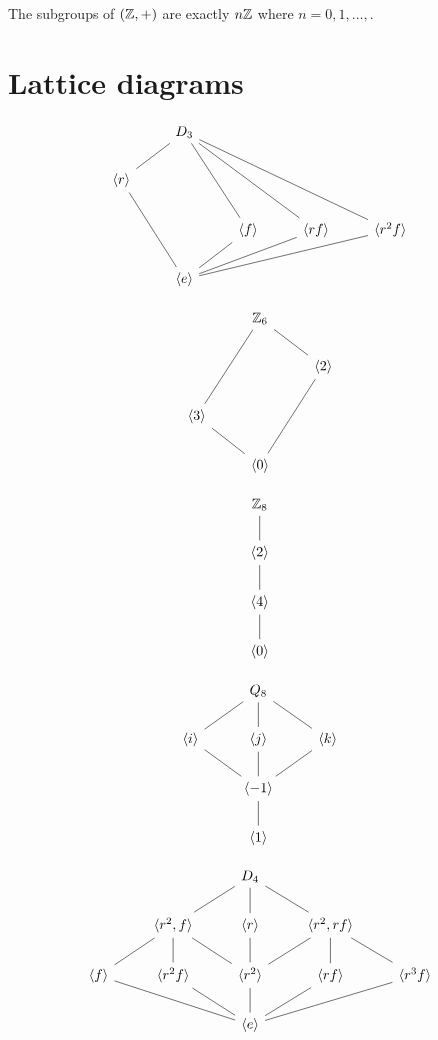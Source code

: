\documentclass{ximera}
\begin{document}
\begin{corollary}
  The subgroups of $(\mathbb Z,+)$ are exactly $n\mathbb Z$ where $n = 0,1,\dots,$.
\end{corollary}


\section{Lattice diagrams}

\[
\begin{tikzcd}
       & D_3 \ar[rdd,-]\ar[rrdd,-]\ar[rrrdd,-]  \ar[ld,-] & & &      \\
 \<r\> \ar[rdd,-]       &       &  & &  \\
       &       &  \< f\> \ar[ld,-]   &  \< rf\> \ar[lld,-]       &  \< r^2f\> \ar[llld,-]        \\   
       & \<e\> & & &
\end{tikzcd}
\]

\[
\begin{tikzcd}
       & \Z_6 \ar[rd,-]  \ar[ldd,-] &       \\
       &       & \<2\> \ar[ldd,-]\\
\< 3\> \ar[rd,-]&       &       \\   
       & \<0\> &
\end{tikzcd}
\]

\[
\begin{tikzcd}
  \Z_8  \ar[d,-] \\
  \<2\> \ar[d,-] \\
  \<4\> \ar[d,-] \\   
  \<0\> 
\end{tikzcd}
\]


\[
\begin{tikzcd}
       & Q_8 \ar[rd,-] \ar[d,-] \ar[ld,-] &       \\
\<i\>  \ar[rd,-] & \<j\>  \ar[d,-]     & \<k\> \ar[ld,-]\\
&\< -1\> \ar[d,-]&        \\   
       & \<1\> &
\end{tikzcd}
\]


\[
\begin{tikzcd}
   &    & D_4 \ar[rd,-] \ar[d,-] \ar[ld,-] &       \\
&\<r^2,f\>  \ar[rd,-] \ar[d,-] \ar[ld,-]& \<r \>  \ar[d,-]     & \<r^2,rf\> \ar[ld,-] \ar[d,-] \ar[rd,-]\\
\<f\>\ar[rrd,-]& \<r^2f\> \ar[rd,-]&\< r^2\> \ar[d,-]  &   \<rf\> \ar[ld,-]& \<r^3f\>\ar[lld,-]     \\   
  &     & \<e\> &  &
\end{tikzcd}
\]
\end{document}
